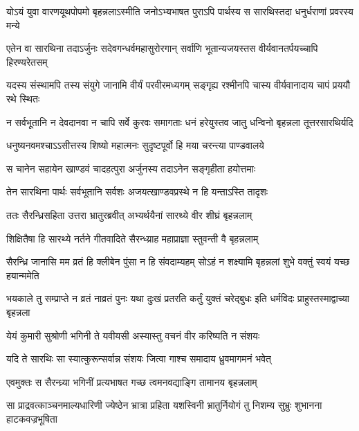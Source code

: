 \twolineshloka
{योऽयं युवा वारणयूथपोपमो बृहन्नलाऽस्मीति जनोऽभ्यभाषत}
{पुराऽपि पार्थस्य स सारथिस्तदा धनुर्धराणां प्रवरस्य मन्ये}


\twolineshloka
{एतेन वा सारथिना तदाऽर्जुनः सदेवगन्धर्वमहासुरोरगान्}
{सर्वाणि भूतान्यजयस्तस वीर्यवानतर्पयच्चापि हिरण्यरेतसम्}


\twolineshloka
{यदस्य संस्थामपि तस्य संयुगे जानामि वीर्यं परवीरमध्यगम्}
{सङ्गृह्य रश्मीनपि चास्य वीर्यवानादाय चापं प्रययौ रथे स्थितः}


\twolineshloka
{न सर्वभूतानि न देवदानवा न चापि सर्वे कुरवः समागताः}
{धनं हरेयुस्तव जातु धन्विनो बृहन्नला तूत्तरसारथिर्यदि}


\twolineshloka
{धनुष्यनवमश्चाऽऽसीत्तस्य शिष्यो महात्मनः}
{सुदृष्टपूर्वो हि मया चरन्त्या पाण्डवालये}


\twolineshloka
{स चानेन सहायेन खाण्डवं चादहत्पुरा}
{अर्जुनस्य तदाऽनेन सङ्गृहीता हयोत्तमाः}


\twolineshloka
{तेन सारथिना पार्थः सर्वभूतानि सर्वशः}
{अजयत्खाण्डवप्रस्थे न हि यन्ताऽस्ति तादृशः}



\twolineshloka
{ततः सैरन्ध्रिसहिता उत्तरा भ्रातुरब्रवीत्}
{अभ्यर्थयैनां सारथ्ये वीर शीघ्रं बृहन्नलाम्}


\twolineshloka
{शिक्षितैषा हि सारथ्ये नर्तने गीतवादिते}
{सैरन्ध्य्राह महाप्राज्ञा स्तुवन्ती वै बृहन्नलाम्}




\twolineshloka
{सैरन्ध्रि जानासि मम व्रतं हि क्लीबेन पुंसा न हि संवदाम्यहम्}
{सोऽहं न शक्ष्यामि बृहन्नलां शुभे वक्तुं स्वयं यच्छ हयान्ममेति}




\threelineshloka
{भयकाले तु सम्प्राप्ते न व्रतं नाव्रतं पुनः}
{यथा दुःखं प्रतरति कर्तुं युक्तं चरेद्बुधः}
{इति धर्मविदः प्राहुस्तस्माद्वाच्या बृहन्नला}


\twolineshloka
{येयं कुमारी सुश्रोणी भगिनी ते यवीयसी}
{अस्यास्तु वचनं वीर करिष्यति न संशयः}


\twolineshloka
{यदि ते सारथिः सा स्यात्कुरून्सर्वान्न संशयः}
{जित्वा गाश्च समादाय ध्रुवमागमनं भवेत्}



\twolineshloka
{एवमुक्तः स सैरन्ध्र्या भगिनीं प्रत्यभाषत}
{गच्छ त्वमनवद्याङ्गि तामानय बृहन्नलाम्}


\fourlineindentedshloka
{सा प्राद्रवत्काञ्चनमाल्यधारिणी}
{ज्येष्ठेन भ्रात्रा प्रहिता यशस्विनी}
{भ्रातुर्नियोगं तु निशम्य सुभ्रुः}
{शुभानना हाटकवज्रभूषिता}


